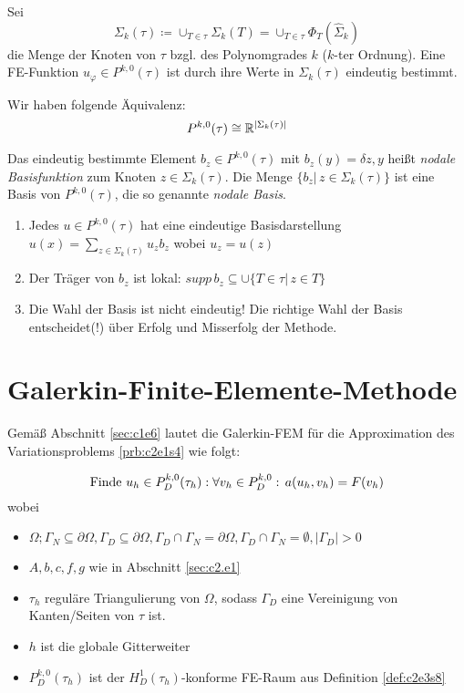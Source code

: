 \documentclass[../skript.tex]{subfiles}
\begin{document}
\begin{corollary}
	Sei
	\[
		\Sigma_k(\tau) \coloneqq \cup_{T\in\tau} \Sigma_k(T) = \cup_{T\in\tau}\Phi_T(\hat{\Sigma}_k)
	\]
	die Menge der Knoten von $\tau$ bzgl. des Polynomgrades $k$ ($k$-ter Ordnung). Eine FE-Funktion $u_\varphi\in P^{k,0}(\tau)$ ist durch ihre Werte in $\Sigma_k(\tau)$ eindeutig bestimmt. 
\end{corollary}
\begin{remark*}
	Wir haben folgende Äquivalenz: 
	\[
		P^{k,0}(\tau) \cong \mathbb{R}^{\vert\Sigma_k(\tau)\vert}
	\]
\end{remark*}
\begin{definition}\label{def:c2e3s11}
	Das eindeutig bestimmte Element $b_z\in P^{k,0}(\tau)$ mit $b_z(y) = \delta{z,y}$ heißt \emph{nodale Basisfunktion} zum Knoten $z\in\Sigma_k(\tau)$. Die Menge $\{b_z\vert\,z\in\Sigma_k(\tau)\}$ ist eine Basis von $P^{k,0}(\tau)$, die so genannte \emph{nodale Basis}.
\end{definition}
\begin{remark}\label{rem:c2e3s12}
	\begin{enumerate}%
		\item Jedes $u\in P^{k,0}(\tau)$ hat eine eindeutige Basisdarstellung $u(x) = \sum_{z\in\Sigma_k(\tau)} u_z b_z$ wobei $u_z = u(z)$
		\item Der Träger von $b_z$ ist lokal: $supp\,b_z\subseteq \cup\{T\in\tau\vert\,z\in T\}$
		\item Die Wahl der Basis ist nicht eindeutig! Die richtige Wahl der Basis entscheidet(!) über Erfolg und Misserfolg der Methode.
	\end{enumerate}
 \end{remark}


 \section{Galerkin-Finite-Elemente-Methode}\label{sec:c2e4}
Gemäß Abschnitt \cref{sec:c1e6} lautet die Galerkin-FEM für die Approximation des Variationsproblems \cref{prb:c2e1s4} wie folgt:

\begin{problem}\label{prb:c2e4s1}
	\[
		\text{Finde } u_h\in P^{k,0}_D(\tau_h):\\
		\forall v_h\in P^{k,0}_D:\,a(u_h,v_h) = F(v_h)
	\]
	wobei
	\begin{itemize}
		\item $\Omega;\Gamma_N\subseteq\partial\Omega, \Gamma_D\subseteq\partial\Omega,\Gamma_D\cap\Gamma_N=\partial\Omega,\Gamma_D\cap\Gamma_N=\emptyset,\vert\Gamma_D\vert > 0$
		\item $A,b,c,f,g$ wie in Abschnitt \cref{sec:c2.e1}
		\item $\tau_h$ reguläre Triangulierung von $\Omega$, sodass $\Gamma_D$ eine Vereinigung von Kanten/Seiten von $\tau$ ist. 
		\item $h$ ist die globale Gitterweiter
		\item $P^{k,0}_D(\tau_h)$ ist der $H^1_D(\tau_h)$-konforme FE-Raum aus Definition \cref{def:c2e3s8}
	\end{itemize}
 \end{problem}
\end{document}
